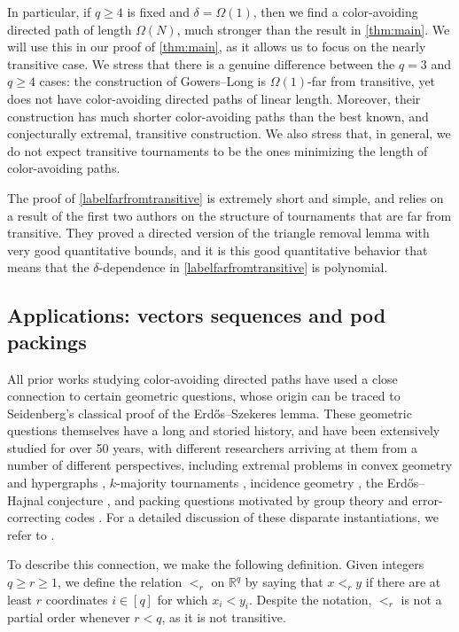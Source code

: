 \documentclass[11pt,reqno]{amsart}
\theoremstyle{definition}
\newcommand{\R}{\mathbb{R}}
\newcommand\1{\mathbf{1}}
\let\geq\geqslant
\begin{document}
In particular, if $q \geq 4$ is fixed and $\delta = \Omega(1)$, then we find a color-avoiding directed path of length $\Omega(N)$, much stronger than the result in \cref{thm:main}. We will use this in our proof of \cref{thm:main}, as it allows us to focus on the nearly transitive case. We stress that there is a genuine difference between the $q=3$ and $q\geq 4$ cases: the construction of Gowers--Long is $\Omega(1)$-far from transitive, yet does not have color-avoiding directed paths of linear length. Moreover, their construction has much shorter color-avoiding paths than the best known, and conjecturally extremal, transitive construction. We also stress that, in general, we do not expect transitive tournaments to be the ones minimizing the length of color-avoiding paths.

The proof of \cref{labelfarfromtransitive} is extremely short and simple, and relies on a result of the first two authors \cite{FoSu} on the structure of tournaments that are far from transitive. They proved a directed version of the triangle removal lemma \cite{MR519318} with very good quantitative bounds, and it is this good quantitative behavior that means that the $\delta$-dependence in \cref{labelfarfromtransitive} is polynomial.




\subsection{Applications: vectors sequences and pod packings}
All prior works studying color-avoiding directed paths have used a close connection to certain geometric questions, whose origin can be traced to Seidenberg's classical proof \cite{MR106189} of the Erd\H os--Szekeres lemma. These geometric questions themselves have a long and storied history, and
have been extensively studied for over 50 years, with different researchers arriving at them from a number of different perspectives,
including extremal problems in convex geometry \cite{MR2065250} and hypergraphs \cite{MR4298506}, $k$-majority tournaments \cite{1505.07312}, incidence geometry \cite{1608.04153}, the Erd\H os--Hajnal conjecture \cite{MR3684779}, and packing questions motivated by group theory \cite{MR219435} and error-correcting codes \cite{MR754867}. For a detailed discussion of these disparate instantiations, we refer to \cite[Section 4.3]{MR3904824}.

To describe this connection, we make the following definition.
Given integers $q \geq r \geq 1$, we define the relation $<_r$ on $\R^q$ by saying that $x<_r y$ if there are at least $r$ coordinates $i \in [q]$ for which $x_i<y_i$. Despite the notation, $<_r$ is not a partial order whenever $r<q$, as it is not transitive. 
\end{document}
